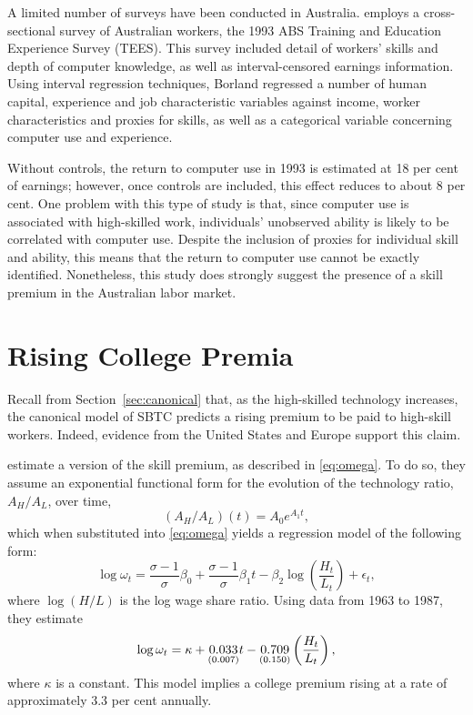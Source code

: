 A limited number of surveys have been conducted in Australia. \citet{Borland2004} employs a cross-sectional survey of Australian workers, the 1993 ABS Training and Education Experience Survey (TEES). This survey included detail of workers' skills and depth of computer knowledge, as well as interval-censored earnings information. Using interval regression techniques, Borland regressed a number of human capital, experience and job characteristic variables against income, worker characteristics and proxies for skills, as well as a categorical variable concerning computer use and experience. 

Without controls, the return to computer use in 1993 is estimated at 18 per cent of earnings; however, once controls are included, this effect reduces to about 8 per cent. One problem with this type of study is that, since computer use is associated with high-skilled work, individuals' unobserved ability is likely to be correlated with computer use. Despite the inclusion of proxies for individual skill and ability, this means that the return to computer use cannot be exactly identified. Nonetheless, this study does strongly suggest the presence of a skill premium in the Australian labor market.

\section{Rising College Premia}

Recall from Section~\ref{sec:canonical} that, as the high-skilled technology increases, the canonical model of SBTC predicts a rising premium to be paid to high-skill workers. Indeed, evidence from the United States and Europe support this claim.

\citet{Katz1992} estimate a version of the skill premium, as described in \eqref{eq:omega}. To do so, they assume an exponential functional form for the evolution of the technology ratio, $A_H/A_L$, over time,
$$  (A_H/A_L)(t) = A_{0}e^{A_1t}, $$
which when substituted into \eqref{eq:omega} yields a regression model of the following form:
$$ \log \omega_t = \frac{\sigma - 1}{\sigma}\beta_0 + \frac{\sigma-1}{\sigma}\beta_1t - \beta_2\log\left(\frac{H_t}{L_t}\right) + \epsilon_t, $$
where $\log(H/L)$ is the log wage share ratio. Using data from 1963 to 1987, they estimate
$$
  \log \omega_t = \kappa + \underset{\scriptsize (0.007)}{0.033} t - \underset{\scriptsize (0.150)}{0.709}\left( \frac{H_t}{L_t} \right),
$$
where $\kappa$ is a constant. This model implies a college premium rising at a rate of approximately 3.3 per cent annually.

